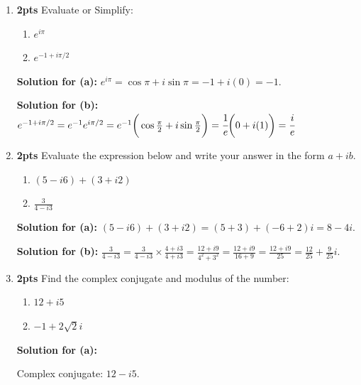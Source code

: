 \documentclass[nohyper,nobib,xcolor=dvipsnames,svgnames,x11names]{tufte-book}
\begin{document}
\begin{enumerate}
    Using De Moivre's Theorem:
    
    $(\frac{1}{2}+\frac{1}{2}i)^{10} = (\frac{\sqrt{2}}{2})^{10}(\cos(10\cdot\frac{\pi}{4})+i\sin(10\cdot\frac{\pi}{4}))$
    
    $= (\frac{2^{1/2}}{2})^{10}(\cos(\frac{5\pi}{2})+i\sin(\frac{5\pi}{2}))$
    
    $= (\frac{1}{2^{1/2}})^{10}(\cos(\frac{\pi}{2}+2\pi)+i\sin(\frac{\pi}{2}+2\pi))$
    
    $= (\frac{1}{2^5})(0+i\cdot 1) = \frac{i}{32}$

    \item \textbf{2pts} Evaluate or Simplify:
    \begin{enumerate}
        \item $e^{i\pi}$
        \item $e^{-1+i\pi/2}$
    \end{enumerate}
    
    \textbf{Solution for (a):}
    $e^{i\pi} = \cos\pi+i\sin\pi = -1+i(0) = -1$.
    
    \textbf{Solution for (b):}
    $e^{-1+i\pi/2} = e^{-1}e^{i\pi/2} = e^{-1}\bigg( \cos{\tfrac{\pi}{2}} + i \sin{\tfrac{\pi}{2}} \bigg) = \cfrac{1}{e}\bigg(0 + i(1) \bigg)= \cfrac{i}{e}$

    \item \textbf{2pts} Evaluate the expression below and write your answer in the form $a+ib$.
    \begin{enumerate}
        \item $(5-i6)+(3+i2)$
        \item $\frac{3}{4-i3}$
    \end{enumerate}
    \textbf{Solution for (a):}
    $(5-i6)+(3+i2) = (5+3)+(-6+2)i = 8-4i$.
    
    \textbf{Solution for (b):}
    $\frac{3}{4-i3} = \frac{3}{4-i3} \times \frac{4+i3}{4+i3} = \frac{12+i9}{4^2+3^2} = \frac{12+i9}{16+9} = \frac{12+i9}{25} = \frac{12}{25}+\frac{9}{25}i$.

    \item \textbf{2pts} Find the complex conjugate and modulus of the number:
    \begin{enumerate}
        \item $12+i5$
        \item $-1+2\sqrt{2}i$
    \end{enumerate}
    \textbf{Solution for (a):}
    
    Complex conjugate: $12-i5$.
    

\end{enumerate}
\end{document}
